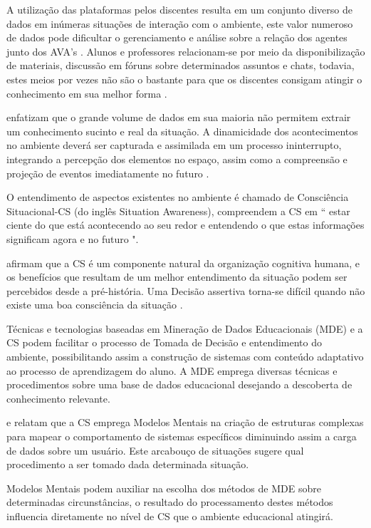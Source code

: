 \documentclass[12pt]{article}
\begin{document}
A utilização das plataformas pelos discentes resulta em um conjunto diverso de dados em inúmeras situações de interação com o ambiente, este valor numeroso de dados pode dificultar o gerenciamento e análise sobre a relação dos agentes junto dos AVA's \cite{Rabelo_et_al2017}. Alunos e professores relacionam-se por meio da disponibilização de materiais, discussão em fóruns sobre determinados assuntos e chats, todavia, estes meios por vezes não são o bastante para que os discentes consigam atingir o conhecimento em sua melhor forma \cite{Falci_et_al_2018}. 

\cite{Endsley2012} enfatizam que o grande volume de dados em sua maioria não permitem extrair um conhecimento sucinto e real da situação. A dinamicidade dos acontecimentos no ambiente deverá ser capturada e assimilada em um processo ininterrupto, integrando a percepção dos elementos no espaço, assim como a compreensão e projeção de eventos imediatamente no futuro \cite{Silva_et_al_2012}.

O entendimento de aspectos existentes no ambiente é chamado de Consciência Situacional-CS (do inglês Situation Awareness), \cite[p.13]{Endsley2012} compreendem a CS em `` estar ciente do que está acontecendo ao seu redor e entendendo o que estas informações significam agora e no futuro ". 

\cite{Roy_Breton_Rousseau_2007} afirmam que a CS é um componente natural da organização cognitiva humana, e os benefícios que resultam de um melhor entendimento da situação podem ser percebidos desde a pré-história. Uma Decisão assertiva torna-se difícil quando não existe uma boa consciência da situação \cite{Endsley2012}. 

Técnicas e tecnologias baseadas em Mineração de Dados Educacionais (MDE) e a CS podem facilitar o processo de Tomada de Decisão e entendimento do ambiente, possibilitando assim a construção de sistemas com conteúdo adaptativo ao processo de aprendizagem do aluno. A MDE emprega diversas técnicas e procedimentos sobre uma base de dados educacional desejando a descoberta de conhecimento relevante. 

\cite{Endsley1995} e \cite{Endsley2012}  relatam que a CS emprega Modelos Mentais na criação de estruturas complexas  para mapear o comportamento de sistemas específicos diminuindo assim a carga de dados sobre um usuário. Este arcabouço de situações sugere qual procedimento a ser tomado dada determinada situação. 

Modelos Mentais podem auxiliar na escolha dos métodos de MDE sobre determinadas circunstâncias, o resultado do processamento destes métodos influencia diretamente no nível de CS que o ambiente educacional atingirá. 
\end{document}

